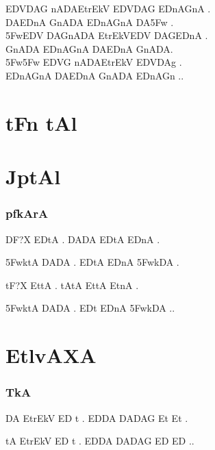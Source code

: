 \def\DevnagVersion{2.17}\documentclass{tufte-book}
\def\dnitem#1{\noindent\llap{#1\space}\leftskip\parindent}
\begin{document}
{{\dnitem{EthA{}I}

EDVDAG\? nADAEtrEkV EDVDAG\? EDnAG\?nA .\\
DAEDnA G\?nADA EDnAG\?nA DA\35Fw .\\
\35FwEDV DAG\?nADA EtrEkVEDV DAG\?EDnA .\\
G\?nADA EDnAG\?nA DAEDnA G\?nADA.\\
\35Fw\35Fw EDVG\? nADAEtrEkV EDVDAg\4 .\\
EDnAG\?nA DAEDnA G\?nADA EDnAG\?n ..


}}


{\dn\chapter{ tFn tAl}}

{\dn\chapter{ JptAl}}

\subsection{{\dn p\?fkArA}}
\noindent
{\dn 

DF?X ED\2tA . DADA ED\2tA ED\2nA .

\35FwktA DADA . ED\2tA ED\2nA \35FwkDA .

tF?X Et\2tA . tAtA Et\2tA Et\2nA .

\35FwktA DADA . ED\2t ED\2nA \35FwkDA ..

}

{\dn
\chapter{EtlvAXA}}

\subsection{{\dn T\?kA}}
\noindent
{\dn

DA EtrEkV ED\2 t . ED\2DA DADAG\? Et\2 Et\2 .

tA EtrEkV ED\2 t . ED\2DA DADAG\? ED\2 ED\2 ..
}
\end{document}
